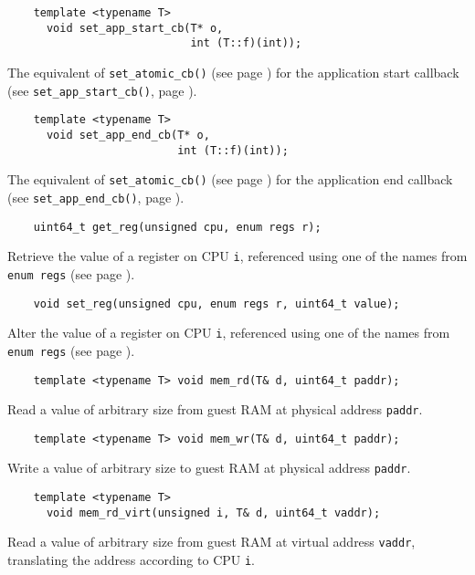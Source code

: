\documentclass[letterpaper, 10pt]{book}
\begin{document}
\label{tf:set_app_start_cb} \begin{verbatim}
    template <typename T>
      void set_app_start_cb(T* o,
                            int (T::f)(int));
\end{verbatim}
The equivalent of \texttt{set\_atomic\_cb()} (see page
\pageref{tf:set_atomic_cb}) for the application start callback (see
\texttt{set\_app\_start\_cb()}, page \pageref{func:set_app_start_cb}).

\label{tf:set_app_end_cb} \begin{verbatim}
    template <typename T>
      void set_app_end_cb(T* o,
                          int (T::f)(int));
\end{verbatim}
The equivalent of \texttt{set\_atomic\_cb()} (see page 
\pageref{tf:set_atomic_cb}) for the application end callback (see 
\texttt{set\_app\_end\_cb()}, page \pageref{func:set_app_end_cb}).

\label{func:get_reg} \begin{verbatim}
    uint64_t get_reg(unsigned cpu, enum regs r);
\end{verbatim}
Retrieve the value of a register on CPU \texttt{i}, referenced using one of the
names from \texttt{enum regs} (see page \pageref{enum:regs}).

\label{func:set_reg} \begin{verbatim}
    void set_reg(unsigned cpu, enum regs r, uint64_t value);
\end{verbatim}
Alter the value of a register on CPU \texttt{i}, referenced using one of the
names from \texttt{enum regs} (see page \pageref{enum:regs}).

\label{tf:mem_rd} \begin{verbatim}
    template <typename T> void mem_rd(T& d, uint64_t paddr);
\end{verbatim}
Read a value of arbitrary size from guest RAM at physical address 
\texttt{paddr}.

\label{tf:mem_wr} \begin{verbatim}
    template <typename T> void mem_wr(T& d, uint64_t paddr);
\end{verbatim}
Write a value of arbitrary size to guest RAM at physical address
\texttt{paddr}.

\label{tf:mem_rd_virt} \begin{verbatim}
    template <typename T> 
      void mem_rd_virt(unsigned i, T& d, uint64_t vaddr);
\end{verbatim}
Read a value of arbitrary size from guest RAM at virtual address
\texttt{vaddr}, translating the address according to CPU \texttt{i}.
\end{document}
